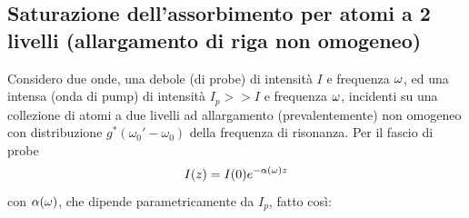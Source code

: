 \subsection{Saturazione dell'assorbimento per atomi a 2 livelli (allargamento di riga non omogeneo)}
Considero due onde, una debole (di probe) di intensità $I$ e frequenza $\omega$, ed una intensa (onda di pump) di intensità $I_p >> I$ e frequenza $\omega$, incidenti su una collezione di atomi a due livelli ad allargamento (prevalentemente) non omogeneo con distribuzione $g^*(\omega_0' - \omega_0)$ della frequenza di risonanza.
Per il fascio di probe
\begin{equation*}
I(z) = I(0) e^{-\alpha(\omega) z}
\end{equation*}
con $\alpha(\omega)$, che dipende parametricamente da $I_p$, fatto così:

